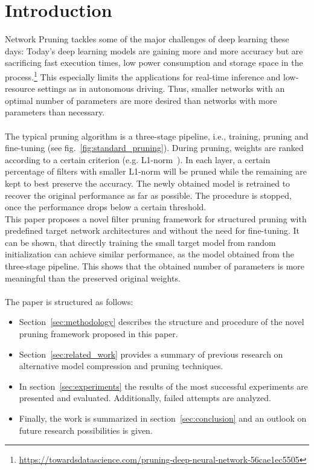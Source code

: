 \documentclass[10pt,twocolumn,letterpaper]{article}
\begin{document}
\section{Introduction}
Network Pruning tackles some of the major challenges of deep learning these days:
Today's deep learning models are gaining more and more accuracy but are sacrificing fast execution times, low power consumption and storage space in the process.\footnote{\url{https://towardsdatascience.com/pruning-deep-neural-network-56cae1ec5505}}
This especially limits the applications for real-time inference and low-resource settings as in autonomous driving.
Thus, smaller networks with an optimal number of parameters are more desired than networks with more parameters than necessary.\\\\
The typical pruning algorithm is a three-stage pipeline, i.e., training, pruning and fine-tuning (see fig.~\ref{fig:standard_pruning}).
During pruning, weights are ranked according to a certain criterion (e.g. L1-norm~\cite{Li2017}).
In each layer, a certain percentage of filters with smaller L1-norm will be pruned while the remaining are kept to best preserve the accuracy.
The newly obtained model is retrained to recover the original performance as far as possible.
The procedure is stopped, once the performance drops below a certain threshold.\\
This paper proposes a novel filter pruning framework for structured pruning with predefined target network architectures and without the need for fine-tuning.
It can be shown, that directly training the small target model from random initialization can achieve similar performance, as the model obtained from the three-stage pipeline.
This shows that the obtained number of parameters is more meaningful than the preserved original weights.\\\\
The paper is structured as follows:
\begin{itemize}
\item Section~\ref{sec:methodology} describes the structure and procedure of the novel pruning framework proposed in this paper.
\item Section~\ref{sec:related_work} provides a summary of previous research on alternative model compression and pruning techniques.
\item In section~\ref{sec:experiments} the results of the most successful experiments are presented and evaluated.
	Additionally, failed attempts are analyzed.
\item Finally, the work is summarized in section~\ref{sec:conclusion} and an outlook on future research possibilities is given.
\end{itemize}
\end{document}

